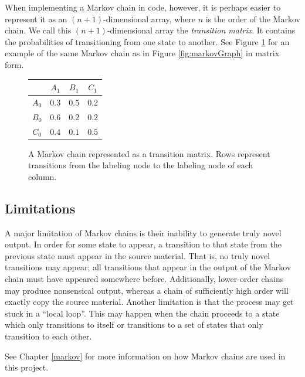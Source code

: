 When implementing a Markov chain in code, however, it is perhaps easier to represent it as an $(n + 1)$-dimensional array, where $n$ is the order of the Markov chain.
We call this $(n + 1)$-dimensional array the \textit{transition matrix}.
It contains the probabilities of transitioning from one state to another.
See Figure \ref{fig:markovMatrix} for an example of the same Markov chain as in Figure \ref{fig:markovGraph} in matrix form.

\begin{figure}[h]
	\centering
	\begin{tabular}{c | c c c}
		& $A_{1}$ & $B_{1}$ & $C_{1}$\\
		\hline
		$A_{0}$ & $0.3$ & $0.5$ & $0.2$\\
		$B_{0}$ & $0.6$ & $0.2$ & $0.2$\\
		$C_{0}$ & $0.4$ & $0.1$ & $0.5$
	\end{tabular}
	\caption[A Markov chain represented as a transition matrix.]{A Markov chain represented as a transition matrix. Rows represent transitions from the labeling node to the labeling node of each column.}
	\label{fig:markovMatrix}
\end{figure}

\subsection{Limitations} \label{bg:markov:limitations}

A major limitation of Markov chains is their inability to generate truly novel output.
In order for some state to appear, a transition to that state from the previous state must appear in the source material.
That is, no truly novel transitions may appear; all transitions that appear in the output of the Markov chain must have appeared somewhere before.
Additionally, lower-order chains may produce nonsensical output, whereas a chain of sufficiently high order will exactly copy the source material.
Another limitation is that the process may get stuck in a ``local loop''.
This may happen when the chain proceeds to a state which only transitions to itself or transitions to a set of states that only transition to each other.

See Chapter \ref{markov} for more information on how Markov chains are used in this project.



